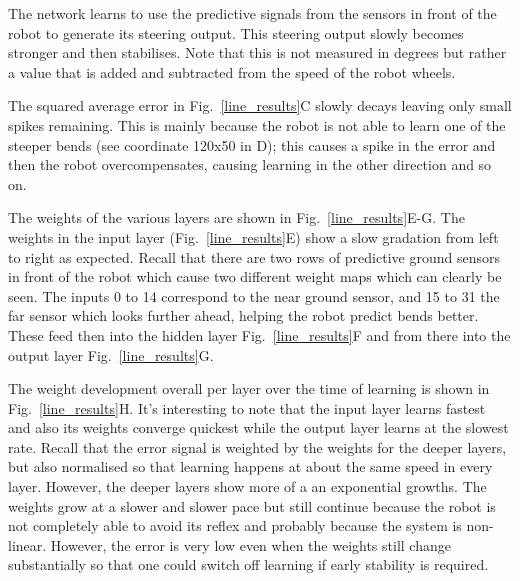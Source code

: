 \documentclass{llncs}
\begin{document}
The network learns to use the predictive signals from the sensors in
front of the robot to generate its steering output.  This steering 
output slowly becomes stronger and
then stabilises. Note that this is not
measured in degrees but rather a value that is added and subtracted from the
speed of the robot wheels.

The squared average error in Fig.~\ref{line_results}C slowly decays
leaving only small spikes remaining. This is mainly because
the robot is not able to learn one of the steeper bends (see
coordinate 120x50 in D); this causes a spike in the error and
then the robot overcompensates, causing learning in the
other direction and so on.

The weights of the various layers are shown in
Fig.~\ref{line_results}E-G.  The weights in the input layer
(Fig.~\ref{line_results}E) show a slow gradation  from left to right as
expected. Recall that there are two rows of predictive ground
sensors in front of the robot which cause two different weight maps
which can clearly be seen. The inputs 0 to 14 correspond to the near
ground sensor, and 15 to 31 the far sensor which looks further ahead, 
helping the robot predict bends better. These feed then into the 
hidden layer Fig.~\ref{line_results}F
and from there into the output layer Fig.~\ref{line_results}G.

The weight development overall per layer over the time of learning
is shown in Fig.~\ref{line_results}H. It's interesting to note
that the input layer learns fastest and also its weights converge
quickest while the output layer learns at the slowest rate. Recall 
that the error signal is weighted by the weights for the deeper
layers, but also normalised so that learning happens at about the
same speed in every layer. However, the deeper layers show more
of a an exponential growths. The weights grow at a slower
and slower pace but still continue because the robot is not completely
able to avoid its reflex and probably because the system is non-linear.
However, the error is very low even when the weights still change
substantially so that one could switch off learning if early stability
is required.
\end{document}
